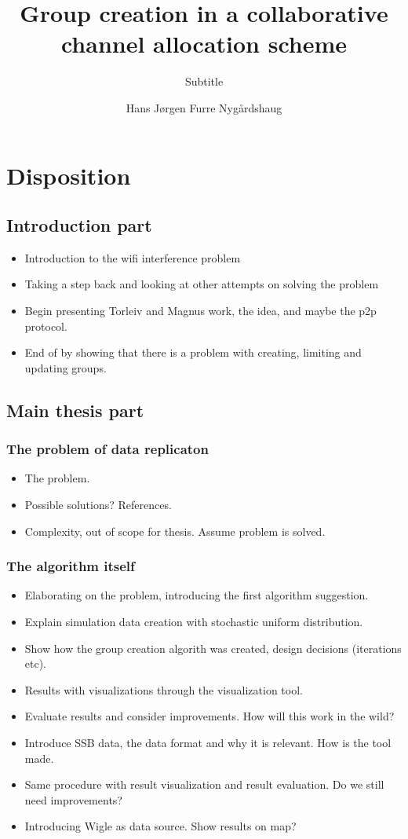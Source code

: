 \documentclass[11pt,a4paper,UKenglish]{report}
\title{Group creation in a collaborative channel allocation scheme}
\subtitle{Subtitle}
\author{Hans Jørgen Furre Nygårdshaug}
\begin{document}
\duoforside[dept={Institutt for informatikk},
  program={Informatikk: programmering og nettverk},
  long]

\section{Disposition} 
\subsection {Introduction part}
\begin{itemize} 
	\item Introduction to the wifi interference problem
	\item Taking a step back and looking at other attempts on solving the problem
	\item Begin presenting Torleiv and Magnus work, the idea, and maybe the p2p protocol.
	\item End of by showing that there is a problem with creating, limiting and updating groups.
\end{itemize}

\subsection {Main thesis part}
\subsubsection{The problem of data replicaton} 
\begin{itemize} 
	\item The problem.
	\item Possible solutions? References.
	\item Complexity, out of scope for thesis. Assume problem is solved.
\end{itemize} 
\subsubsection{The algorithm itself} 
\begin{itemize} 
	\item Elaborating on the problem, introducing the first algorithm suggestion.
	\item Explain simulation data creation with stochastic uniform distribution.
	\item Show how the group creation algorith was created, design decisions (iterations etc).
	\item Results with visualizations through the visualization tool. 
	\item Evaluate results and consider improvements. How will this work in the wild?
	\item Introduce SSB data, the data format and why it is relevant. How is the tool made.
	\item Same procedure with result visualization and result evaluation. Do we still need improvements?
	\item Introducing Wigle as data source. Show results on map?
\end{itemize}
\end{document}

